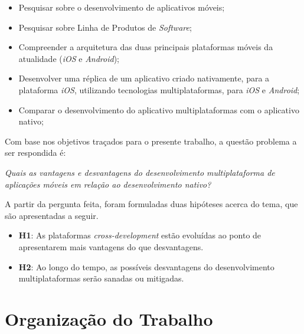 \begin{itemize}
    \item Pesquisar sobre o desenvolvimento de aplicativos móveis;
    \item Pesquisar sobre Linha de Produtos de \textit{Software};
    \item Compreender a arquitetura das duas principais plataformas móveis da atualidade (\textit{iOS} e \textit{Android});
    \item Desenvolver uma réplica de um aplicativo criado nativamente, para a plataforma \textit{iOS}, utilizando tecnologias multiplataformas, para \textit{iOS} e \textit{Android};
    \item Comparar o desenvolvimento do aplicativo multiplataformas com o aplicativo nativo;
\end{itemize}
Com base nos objetivos traçados para o presente trabalho, a questão problema a ser respondida é:
\begin{center}
    \textit{Quais as vantagens e desvantagens do desenvolvimento multiplataforma de aplicações móveis em relação ao desenvolvimento nativo?}
\end{center}
A partir da pergunta feita, foram formuladas duas hipóteses acerca do tema, que são apresentadas a seguir.

\begin{itemize}
    \item \textbf{H1}: As plataformas \textit{cross-development} estão evoluídas ao ponto de apresentarem mais vantagens do que desvantagens.
    \item \textbf{H2}: Ao longo do tempo, as possíveis desvantagens do desenvolvimento multiplataformas serão sanadas ou mitigadas.
\end{itemize}

\section{Organização do Trabalho}\label{sec:organizacao}

